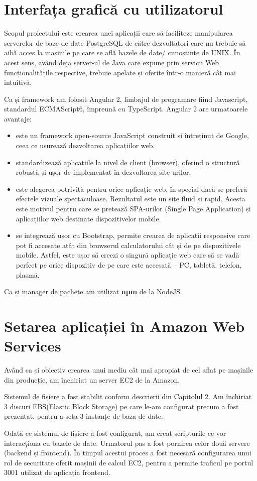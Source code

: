 \section{Interfața grafică cu utilizatorul}
Scopul proiectului este crearea unei aplicații care să faciliteze manipularea serverelor de baze de date PostgreSQL de către dezvoltatori care nu trebuie să aibă acces la mașinile pe care se află bazele de date/ cunoștinte de UNIX. În acest sens, având deja server-ul de Java care expune prin servicii Web funcționalitățile respective, trebuie apelate și oferite într-o manieră cât mai intuitivă. 
\par
Ca și framework am folosit Angular 2, limbajul de programare fiind Javascript, standardul ECMAScript6, împreună cu TypeScript. Angular 2 are urmatoarele avantaje:
\begin{itemize}
\item este un framework open-source JavaScript construit și întreținut de Google, ceea ce usurează dezvoltarea aplicațiilor web.
\item standardizează aplicațiile la nivel de client (browser), oferind o structură robustă și ușor de implementat în dezvoltarea site-urilor.
\item este alegerea potrivită pentru orice aplicație web, în special dacă se preferă efectele vizuale spectaculoase. Rezultatul este un site fluid și rapid. Acesta este motivul pentru care se pretează SPA-urilor (Single Page Application) și aplicațiilor web destinate dispozitivelor mobile.
\item se integrează ușor cu Bootstrap, permite crearea de aplicații responsive care pot fi accesate atât din browserul calculatorului cât și de pe dispozitivele mobile. Astfel, este ușor să creezi o singură aplicație web care să se vadă perfect pe orice dispozitiv de pe care este accesată – PC, tabletă, telefon, plasmă.
\end{itemize}
\par Ca și manager de pachete am utilizat \textbf{npm} de la NodeJS.
\newpage
\section{Setarea aplicației în Amazon Web Services}
Având ca și obiectiv crearea unui mediu cât mai apropiat de cel aflat pe mașinile din producție, am închiriat un server EC2 de la Amazon.
\par
Sistemul de fișiere a fost stabilit conform descrierii din Capitolul 2. Am închiriat 3 discuri EBS(Elastic Block Storage) pe care le-am configurat precum a fost prezentat, pentru a seta 3 instanțe de baza de date.
\par 
Odată ce sistemul de fișiere a fost configurat, am creat scripturile ce vor interacționa cu bazele de date. Urmatorul pas a fost pornirea celor două servere (backend și frontend). În timpul acestui proces a fost necesară configurarea unui rol de securitate oferit mașinii de calcul EC2, pentru a permite traficul pe portul 3001 utilizat de aplicația frontend.